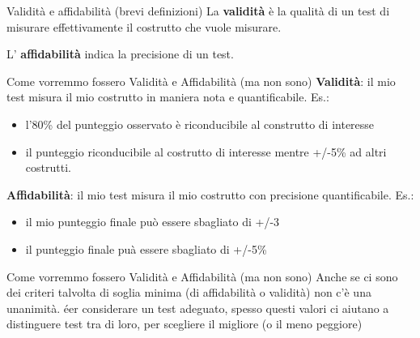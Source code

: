 \documentclass[
  ignorenonframetext,
]{beamer}
\providecommand{\tightlist}{%
  \setlength{\itemsep}{0pt}\setlength{\parskip}{0pt}}
\begin{document}
\begin{frame}{Validità e affidabilità (brevi definizioni)}
\label{validituxe0-e-affidabilituxe0-brevi-definizioni}
La \textbf{validità} è la qualità di un test di misurare effettivamente
il costrutto che vuole misurare.

L' \textbf{affidabilità} indica la precisione di un test.
\end{frame}

\begin{frame}{Come vorremmo fossero Validità e Affidabilità (ma non
sono)}
\label{come-vorremmo-fossero-validituxe0-e-affidabilituxe0-ma-non-sono}
\textbf{Validità}: il mio test misura il mio costrutto in maniera nota e
quantificabile. Es.:

\begin{itemize}
\tightlist
\item
  l'80\% del punteggio osservato è riconducibile al construtto di
  interesse
\item
  il punteggio riconducibile al costrutto di interesse mentre +/-5\% ad
  altri costrutti.
\end{itemize}

\vfill
\pause

\textbf{Affidabilità}: il mio test misura il mio costrutto con
precisione quantificabile. Es.:

\begin{itemize}
\tightlist
\item
  il mio punteggio finale può essere sbagliato di +/-3
\item
  il punteggio finale puà essere sbagliato di +/-5\%
\end{itemize}
\end{frame}

\begin{frame}{Come vorremmo fossero Validità e Affidabilità (ma non
sono)}
\label{come-vorremmo-fossero-validituxe0-e-affidabilituxe0-ma-non-sono-1}
Anche se ci sono dei criteri talvolta di soglia minima (di affidabilità
o validità) non c'è una unanimità. éer considerare un test adeguato,
spesso questi valori ci aiutano a distinguere test tra di loro, per
scegliere il migliore (o il meno peggiore)

\vfill

\begin{center}
\end{center}
\end{frame}
\end{document}

